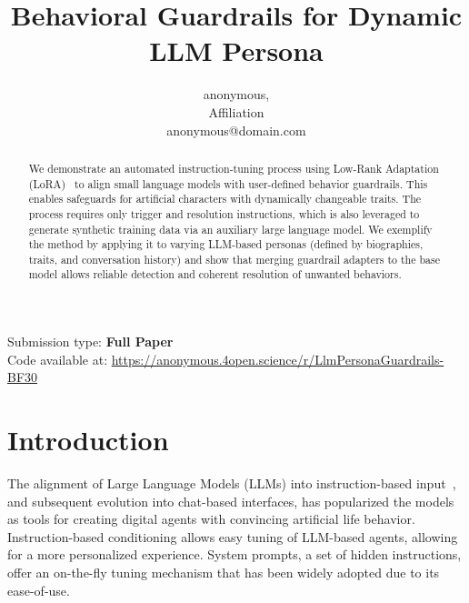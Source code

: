\documentclass[letterpaper]{article}
\title{Behavioral Guardrails for Dynamic LLM Persona}
\author{
    anonymous, 
    \mbox{}\\
    Affiliation \\ 
    anonymous@domain.com
} %
\begin{document}
\maketitle

\begin{abstract}
    We demonstrate an automated instruction-tuning process using Low-Rank Adaptation (LoRA)~\cite{hu2021lora} to align small language models with user-defined behavior guardrails. This enables safeguards for artificial characters with dynamically changeable traits. The process requires only trigger and resolution instructions, which is also leveraged to generate synthetic training data via an auxiliary large language model. We exemplify the method by applying it to varying LLM-based personas (defined by biographies, traits, and conversation history) and show that merging guardrail adapters to the base model allows reliable detection and coherent resolution of unwanted behaviors.
\end{abstract}


Submission type: \textbf{Full Paper}\\

Code available at: \url{https://anonymous.4open.science/r/LlmPersonaGuardrails-BF30}

\section{Introduction}
The alignment of Large Language Models (LLMs) into instruction-based input~\cite{ouyang2022training}, and subsequent evolution into chat-based interfaces, has popularized the models as tools for creating digital agents with convincing artificial life behavior. Instruction-based conditioning allows easy tuning of LLM-based agents, allowing for a more personalized experience. System prompts, a set of hidden instructions, offer an on-the-fly tuning mechanism that has been widely adopted due to its ease-of-use.
\end{document}
